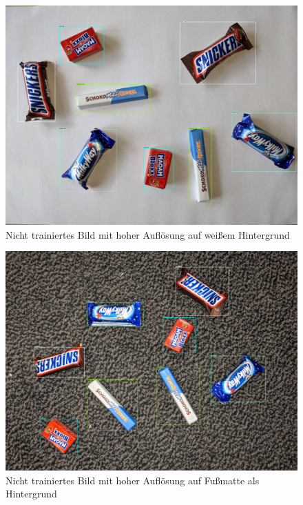     \begin{figure}[H]
        \centering
        \includegraphics[angle = 90, width = \textwidth]{Bilder/models/model_comparison/faster_rcnn_resnet101_v1_640x640_coco17_tpu-8/HD_on_white.jpg}
        \caption{Nicht trainiertes Bild mit hoher Auflösung auf weißem Hintergrund}
    \end{figure}
    
    \begin{figure}[H]
        \centering
        \includegraphics[angle = 90, width = \textwidth]{Bilder/models/model_comparison/faster_rcnn_resnet101_v1_640x640_coco17_tpu-8/HD_on_doormat.jpg}
        \caption{Nicht trainiertes Bild mit hoher Auflösung auf Fußmatte als Hintergrund}
    \end{figure}
    
